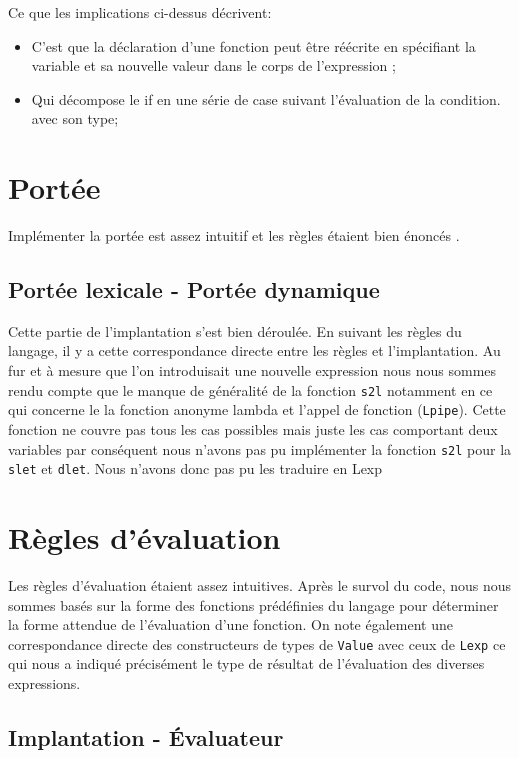 \documentclass[10pt, titlepage]{article}
\begin{document}
Ce que les implications ci-dessus décrivent:

\begin{itemize}
    \item C'est que la déclaration d'une fonction peut être réécrite en
    spécifiant la variable et sa nouvelle valeur dans  le corps de l'expression ;
    \item Qui décompose le if en une série de case suivant  l'évaluation de la condition.
    avec son type;
\end{itemize}


\section{Portée}

Implémenter la portée est assez intuitif  et les règles étaient bien énoncés .

\subsection{Portée lexicale - Portée dynamique }

Cette partie de l'implantation s'est bien déroulée. En suivant les
règles du langage, il y a cette correspondance directe entre les
règles et l'implantation. Au fur et à mesure que l'on introduisait une nouvelle
expression nous nous sommes rendu compte que le manque de généralité de la fonction  
\texttt{s2l} notamment en ce qui concerne le la fonction anonyme lambda  et l'appel de fonction (\texttt{Lpipe}). Cette fonction ne couvre pas tous les cas possibles mais juste les cas comportant deux variables par conséquent nous n'avons pas pu implémenter la fonction \texttt{s2l} pour la \texttt{slet} et \texttt{dlet}. Nous n'avons donc pas pu les  traduire en Lexp

\section{Règles d'évaluation}

Les règles d'évaluation étaient assez intuitives. Après le survol du code, nous nous sommes basés sur la forme des fonctions prédéfinies du langage pour déterminer la forme attendue de l'évaluation d'une fonction. On note également une correspondance directe des constructeurs de types de \texttt{Value} avec ceux de \texttt{Lexp} ce qui
nous a indiqué précisément le type de résultat de l'évaluation des diverses
expressions.

\subsection{Implantation - Évaluateur}
\end{document}
